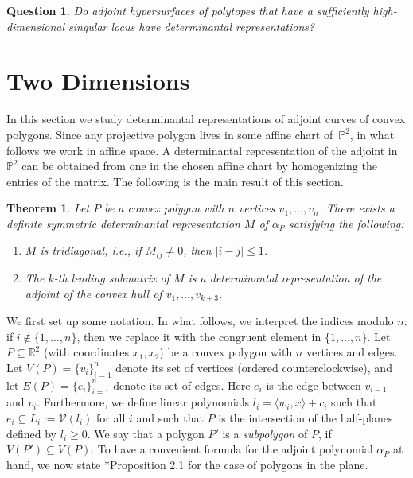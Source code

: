 \documentclass[a4paper,10pt]{amsart}
\theoremstyle{definition}
\theoremstyle{plain}
\newtheorem{thm}[Def]{Theorem}
\newtheorem{frag}[Def]{Question}
\newcommand{\cV}{{\mathcal V}}
\newcommand{\R}{{\mathbb R}}
\begin{document}
\begin{frag}
Do adjoint hypersurfaces of polytopes that have a sufficiently high-dimensional singular locus have determinantal representations?
\end{frag}


\section{Two Dimensions} \label{sec:3}
In this section we study determinantal representations of adjoint curves of convex polygons. Since any projective polygon lives in some affine chart of~$\mathbb{P}^2$, in what follows we work in affine space. A determinantal representation of the adjoint in~$\mathbb{P}^2$ can be obtained from one in the chosen affine chart by homogenizing the entries of the matrix. The following is the main result of this section.

\begin{thm} \label{thm:recursiveDetRep}
 Let $P$ be a convex polygon with $n$ vertices $v_1, \dots, v_n$. There exists a definite symmetric determinantal representation $M$ of $\alpha_P$ satisfying the following:
 \begin{enumerate}
     \item $M$ is \emph{tridiagonal}, i.e., if $M_{ij} \neq 0$, then $|i-j| \leq 1$.
     \item The $k$-th leading submatrix of $M$ is a determinantal representation of the adjoint of the convex hull of $v_1, \dots, v_{k+3}$.
 \end{enumerate}
\end{thm}
We first set up some notation.  In what follows, we interpret the indices modulo $n$: if $i\not\in\{1,\ldots,n\}$, then we replace it with the congruent element in $\{1,\ldots,n\}$. 
Let $P \subseteq \R^2$ (with coordinates $x_1, x_2$) be a convex polygon with $n$ vertices and edges. Let $V(P) = \{v_i\}_{i=1}^n$ denote its set of vertices (ordered counterclockwise), and let $E(P) = \{e_i\}_{i=1}^n$ denote its set of edges. Here $e_i$ is the edge between $v_{i-1}$ and $v_i$. Furthermore, we define linear polynomials $l_i = \langle w_i, x \rangle + c_i$ such that $e_i \subseteq L_i := \cV(l_i)$ for all $i$ and such that $P$ is the intersection of the half-planes defined by $l_i \geq 0$. We say that a polygon $P'$ is a \emph{subpolygon} of $P$, if $V(P') \subseteq V(P)$. 
To have a convenient formula for the adjoint polynomial $\alpha_P$ at hand, we now state \cite{PavlovTelen2024PosGeom}*{Proposition 2.1} for the case of polygons in the plane.
\end{document}
